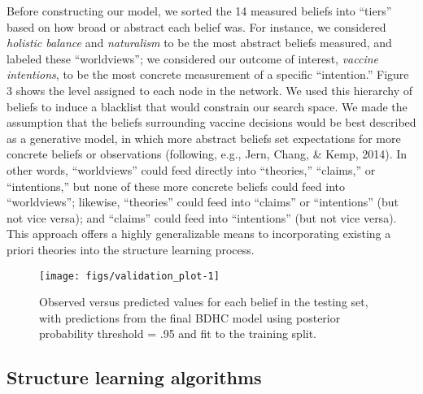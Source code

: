 \documentclass[10pt, letterpaper]{article}
\newenvironment{CodeChunk}{}{}
\begin{document}
Before constructing our model, we sorted the 14 measured beliefs into
``tiers'' based on how broad or abstract each belief was. For instance,
we considered \emph{holistic balance} and \emph{naturalism} to be the
most abstract beliefs measured, and labeled these ``worldviews''; we
considered our outcome of interest, \emph{vaccine intentions}, to be the
most concrete measurement of a specific ``intention.'' Figure 3 shows
the level assigned to each node in the network. We used this hierarchy
of beliefs to induce a blacklist that would constrain our search space.
We made the assumption that the beliefs surrounding vaccine decisions
would be best described as a generative model, in which more abstract
beliefs set expectations for more concrete beliefs or observations
(following, e.g., Jern, Chang, \& Kemp, 2014). In other words,
``worldviews'' could feed directly into ``theories,'' ``claims,'' or
``intentions,'' but none of these more concrete beliefs could feed into
``worldviews''; likewise, ``theories'' could feed into ``claims'' or
``intentions'' (but not vice versa); and ``claims'' could feed into
``intentions'' (but not vice versa). This approach offers a highly
generalizable means to incorporating existing a priori theories into the
structure learning process.

\begin{CodeChunk}
\begin{figure*}[h]

{\centering \texttt{[image: figs/validation\_plot-1]} 

}

\caption[Observed versus predicted values for each belief in the testing set, with predictions from the final BDHC model using posterior probability threshold = .95 and fit to the training split]{Observed versus predicted values for each belief in the testing set, with predictions from the final BDHC model using posterior probability threshold = .95 and fit to the training split.}\label{fig:validation_plot}
\end{figure*}
\end{CodeChunk}

\subsection{Structure learning
algorithms}\label{structure-learning-algorithms}
\end{document}
